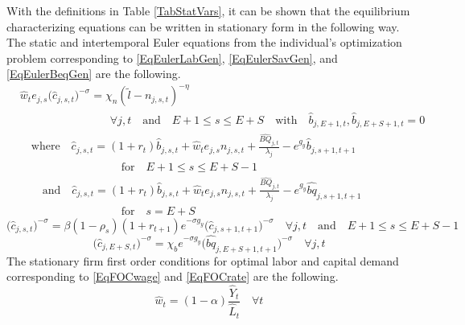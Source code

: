 \documentclass[letterpaper,12pt]{article}
\theoremstyle{definition}
\begin{document}
\begin{spacing}{1.5}
    \noindent With the definitions in Table \ref{TabStatVars}, it can be shown that the equilibrium characterizing equations can be written in stationary form in the following way. The static and intertemporal Euler equations from the individual's optimization problem corresponding to \eqref{EqEulerLabGen}, \eqref{EqEulerSavGen}, and \eqref{EqEulerBeqGen} are the following.
    \begin{equation}\label{EqEulerLabStat}
      \begin{split}
        &\hat{w}_t e_{j,s}\bigl(\hat{c}_{j,s,t}\bigr)^{-\sigma} = \chi_n (\tilde{l} - n_{j,s,t})^{-\eta} \\
        &\quad\quad\quad\quad\quad\quad\quad\quad\forall j,t \quad\text{and}\quad E+1\leq s\leq E+S \quad\text{with}\quad \hat{b}_{j,E+1,t},\hat{b}_{j,E+S+1,t}=0 \\
        &\quad\text{where}\quad \hat{c}_{j,s,t} = \left(1+r_t\right)\hat{b}_{j,s,t} + \hat{w}_t e_{j,s}n_{j,s,t} + \frac{\hat{BQ}_{j,t}}{\lambda_j} - e^{g_y}\hat{b}_{j,s+1,t+1} \\
        &\quad\quad\quad\quad\quad\quad\quad\quad\quad\text{for}\quad E+1\leq s\leq E+S-1 \\
        &\quad\quad\text{and}\quad \hat{c}_{j,s,t} = \left(1+r_t\right)\hat{b}_{j,s,t} + \hat{w}_t e_{j,s}n_{j,s,t} + \frac{\hat{BQ}_{j,t}}{\lambda_j} - e^{g_y}\hat{bq}_{j,s+1,t+1} \\
        &\quad\quad\quad\quad\quad\quad\quad\quad\quad\text{for}\quad s=E+S
      \end{split}
    \end{equation}
    \begin{equation}\label{EqEulerSavStat}
      \bigl(\hat{c}_{j,s,t}\bigr)^{-\sigma} = \beta(1-\rho_s)(1+r_{t+1})e^{-\sigma g_y}\bigl(\hat{c}_{j,s+1,t+1}\bigr)^{-\sigma}\quad\forall j,t \quad\text{and}\quad E+1\leq s\leq E+S-1
    \end{equation}
    \begin{equation}\label{EqEulerBeqStat}
      \bigl(\hat{c}_{j,E+S,t}\bigr)^{-\sigma} = \chi_b e^{-\sigma g_y}\bigl(\hat{bq}_{j,E+S+1,t+1}\bigr)^{-\sigma} \quad\forall j,t
    \end{equation}
    The stationary firm first order conditions for optimal labor and capital demand corresponding to \eqref{EqFOCwage} and \eqref{EqFOCrate} are the following.
    \begin{equation}\label{EqFOCwageStat}
       \hat{w}_t = (1-\alpha)\frac{\hat{Y}_t}{\hat{L}_t} \quad \forall t
    \end{equation}

\end{spacing}
\end{document}
